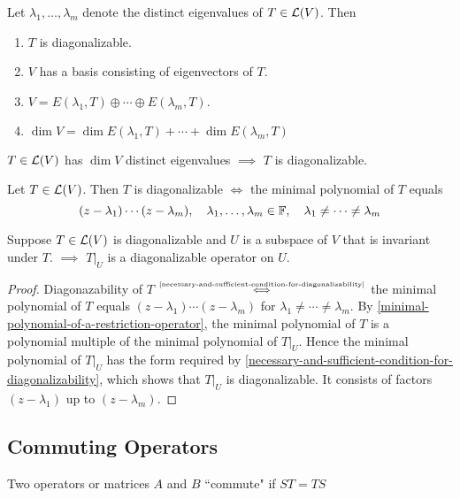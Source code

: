 \begin{thm}
    \label{conditions-equivalent-to-diagonalizability}
    Let $\lambda_1, \dots,\lambda_m$ denote the distinct eigenvalues of $T\in \mathcal{L} (V)$. Then
    \begin{enumerate}[label=(\alph*)]
        \item $T$ is diagonalizable.
        \item $V$ has a basis consisting of eigenvectors of $T$.
        \item $V=E(\lambda_1, T) \oplus \cdots \oplus E(\lambda_m, T).$
        \item $\dim V = \dim E(\lambda_1, T) + \cdots + \dim E(\lambda_m, T)$
    \end{enumerate}
\end{thm}

\setcounter{thm}{57}
\begin{thm}
    \label{enough-eigenvalues-implies-diagonalizability}
    $T\in \mathcal{L}(V)$ has $\dim V$ distinct eigenvalues $\implies$ $T$ is diagonalizable.
\end{thm}

\pagebreak

\setcounter{thm}{61}
\begin{thm}
    \label{necessary-and-sufficient-condition-for-diagonalizability}
    Let $T\in \mathcal{L} (V)$. Then $T$ is diagonalizable $\iff$ the minimal polynomial of $T$ equals
    \begin{equation}
        (z-\lambda_1) \cdots (z-\lambda_m), \quad \lambda_1, \dots, \lambda_m \in \mathbb{F}, \quad \lambda_1 \neq \cdots \neq \lambda_m
    \end{equation}
\end{thm}

\setcounter{thm}{64}
\begin{thm}
    \label{restriction-ofdiagonalizable-operator-to-invariant-subspace}
    Suppose $T\in \mathcal{L}(V)$ is diagonalizable and $U$ is a subspace of $V$ that is invariant under $T$. $\implies$ $\left.T\right|_U$ is a diagonalizable operator on $U$.
\end{thm}
\begin{proof}
    Diagonazability of $T$ $\mathsmaller{\overset{\text{\ref{necessary-and-sufficient-condition-for-diagonalizability}}}{\iff}}$ the minimal polynomial of $T$ equals $(z-\lambda_1)\cdots(z-\lambda_m)$ for $\lambda_1 \neq \cdots \neq \lambda_m$. By \ref{minimal-polynomial-of-a-restriction-operator}, the minimal polynomial of $T$ is a polynomial multiple of the minimal polynomial of $\left.T\right|_U$. Hence the minimal polynomial of $\left.T\right|_U$  has the form required by \ref{necessary-and-sufficient-condition-for-diagonalizability}, which shows that $\left.T\right|_U$ is diagonalizable. It consists of factors $(z-\lambda_1)$ up to $(z-\lambda_m)$.
\end{proof}

\subsection{Commuting Operators}
\begin{mydef}
    Two operators or matrices $A$ and $B$ ``commute" if $ST=TS$
\end{mydef}

